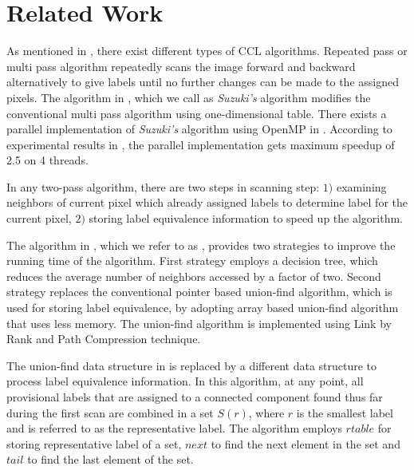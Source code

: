 \vspace{\sectionSpace}
\section{Related Work}
\label{sec:related_works}

As mentioned in \cite{Suzuki2003_Linear}, there exist different types of CCL
algorithms. Repeated pass or multi pass algorithm repeatedly scans the image
forward and backward alternatively to give labels until no further changes can
be made to the assigned
pixels\cite{Haralick1981_Repeated,Hashizume1990_Algorithm}. 
The algorithm in \cite{Suzuki2003_Linear}, which we call as {\em Suzuki's} algorithm modifies the
conventional multi pass algorithm using one-dimensional table. There exists a
parallel implementation of {\em Suzuki's} algorithm using OpenMP in
\cite{Niknam2010_Parallel}. According to experimental results in
\cite{Niknam2010_Parallel}, the parallel implementation gets maximum speedup of
2.5 on 4 threads.

In any two-pass algorithm, there are two steps in scanning step: $1)$ examining neighbors of current pixel which already
assigned labels to determine label for the current pixel, $2)$ storing label equivalence information to speed up the algorithm. 

The algorithm in \cite{Wu2009_LRPC}, which we refer to as \lrpc, provides two strategies to improve the running time of the algorithm.
First strategy employs a decision tree, which reduces the average number of neighbors accessed by a factor of two.
Second strategy replaces the conventional pointer based union-find algorithm, which is used for storing label equivalence,
by adopting array based union-find algorithm that uses less memory. The
union-find algorithm is implemented using Link by Rank and Path Compression technique. %

The union-find data structure in \cite{He2008_Run} is replaced by a different data structure to process label equivalence
information. In this algorithm, at any point, all provisional labels that are assigned to a connected 
component found thus far during the first scan are combined in a set $S(r)$, where $r$ is the smallest label and is 
referred to as the representative label. The algorithm employs $rtable$ for storing representative label of a set, $next$ to 
find the next element in the set and $tail$ to find the last element of the set.


